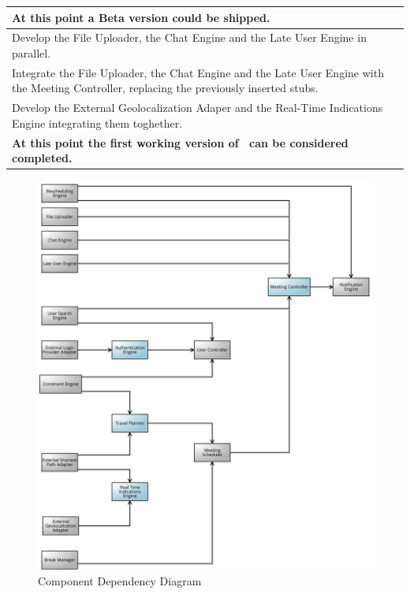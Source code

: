 \begin{longtable}{|m{16cm}|}
	\\ \hline
	\textbf{At this point a Beta version could be shipped.}
	\\ \hline Develop the File Uploader, the Chat Engine and the Late User Engine in parallel.
	\\ \hline Integrate the File Uploader, the Chat Engine and the Late User Engine with the Meeting Controller, replacing the previously inserted stubs.
	\\ \hline Develop the External Geolocalization Adaper and the Real-Time Indications Engine integrating them toghether.
	\\ \hline
	\textbf{At this point the first working version of \projectname~can be considered completed.} \hline
\end{longtable}

\begin{figure}[!h]
	\centering\includegraphics[scale = 0.20]{Images/UMLDiagrams/DependencyDiagramColored.png}
	\caption{Component Dependency Diagram}
\end{figure}

\clearpage